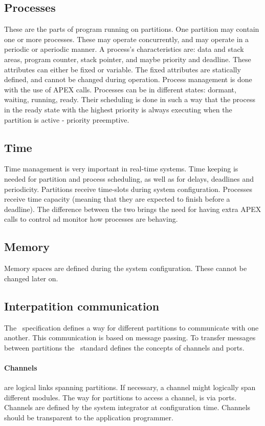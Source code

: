 \subsection{Processes}
These are the parts of program running on partitions. One partition
may contain one or more processes. These may operate concurrently,
and may operate in a periodic or aperiodic manner. A process's 
characteristics are: data and stack areas, program counter, stack pointer,
and maybe priority and deadline. These attributes can either be fixed 
or variable. The fixed attributes are statically defined, and cannot
be changed during operation.
\cite{page_19}
Process management is done with the use of APEX calls.
Processes can be in different states: dormant, waiting, running, ready.
Their scheduling is done in such a way that the process in the ready state
with the highest priority is always executing when the partition is active - priority preemptive.
\cite{page_20}

\subsection{Time}
Time management is very important in real-time systems.
Time keeping is needed for partition and process scheduling,
as well as for delays, deadlines and periodicity.
Partitions receive time-slots during system configuration.
Processes receive time capacity (meaning that they are expected
to finish before a deadline).
The difference between the two brings the need for having extra APEX calls
to control ad monitor how processes are behaving.
\cite{page_25}

\subsection{Memory}
Memory spaces are defined during the system configuration. These cannot
be changed later on.

\subsection{Interpatition communication}
The \arinc\ specification defines a way for different partitions to communicate with one another.
This communication is based on message passing. To transfer messages between partitions the \arinc\ standard
defines the concepts of channels and ports.

\paragraph{Channels} are logical links spanning partitions. If necessary, 
a channel might logically span different modules. 
The way for partitions to access a channel, is via ports.
Channels are defined by the system integrator at configuration time.
Channels should be transparent to the application programmer.

